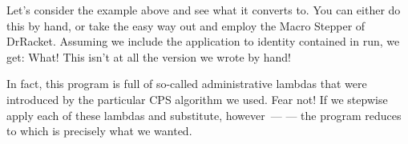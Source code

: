 
Let’s consider the example above and see what it converts to. You can either do
this by hand, or take the easy way out and employ the Macro Stepper of DrRacket.
Assuming we include the application to identity contained in run, we get:
What! This isn’t at all the version we wrote by hand!

In fact, this program is full of so-called administrative lambdas that were
introduced by the particular CPS algorithm we used. Fear not! If we stepwise
apply each of these lambdas and substitute, however\ ---
--- the program reduces to
which is precisely what we wanted.
